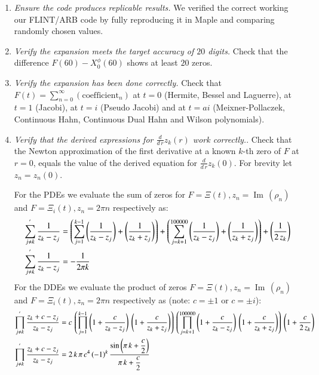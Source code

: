 \documentclass[a4paper,11pt,twoside]{amsart}
\renewcommand\Im{{\operatorname{Im\,}}}
\newcommand{\verifiedeq}{=}
\newcommand{\verifiedeq}{\stackrel{\checkmark}{=}}
\begin{document}
\begin{enumerate}
\item \textit{Ensure the code produces replicable results.} We verified the correct working our FLINT/ARB code by fully reproducing it in Maple\texttrademark  \cite{map} and comparing randomly chosen values. 
\item  \textit{Verify the expansion meets the target accuracy of $20$ digits.} Check that the difference $F(60)-X^\phi_0(60)$ shows at least $20$ zeros.
\item  \textit{Verify the expansion has been done correctly.} Check that $F(t) \verifiedeq \sum_{n=0}^\infty (\text{coefficient}_n)$ at $t=0$ (Hermite, Bessel and Laguerre), at $t=1$ (Jacobi), at $t=i$ (Pseudo Jacobi) and at $t\verifiedeq ai$ (Meixner-Pollaczek, Continuous Hahn, Continuous Dual Hahn and Wilson polynomials). 
\item \textit{Verify that the derived expressions for $\frac{d}{d\,r}z_k(r)$ work correctly.}. Check that the Newton approximation of the first derivative at a known $k$-th zero of $F$ at $r=0$, equals the value of the derived equation for $\frac{d}{d\,r}z_k(0)$. For brevity let $z_n = z_n(0)$. 

For the PDEs we evaluate the sum of zeros for $F=\Xi(t), z_n=\Im(\rho_n)$ and $F=\Xi_i(t), z_n=2\pi n$ respectively as:
\begin{align}
 \sum_{j \ne k}^{'} \frac{1}{z_k-z_j} &\verifiedeq \left(\sum_{j =1}^{k-1} \left(\frac{1}{z_k-z_j}\right)+\left(\frac{1}{z_k+z_j}\right)\right) +\left(\sum_{j = k+1}^{100000} \left(\frac{1}{z_k-z_j}\right)+\left(\frac{1}{z_k+z_j}\right)\right)+\left(\frac{1}{2\,z_k} \right) \notag \\
  \sum_{j \ne k}^{'} \frac{1}{z_k-z_j} &\verifiedeq -\frac{1}{2\pi k} \notag
\end{align}
For the DDEs we evaluate the product of zeros $F\verifiedeq \Xi(t), z_n=\Im(\rho_n)$ and $F=\Xi_i(t), z_n=2\pi n$ respectively as (note: $c \verifiedeq \pm 1$ or $c =\pm i$):
\begin{align}
 \prod_{j \ne k}^{'} \frac{z_k+c-z_j}{z_k-z_j} &\verifiedeq c\,\left(\prod_{j =1}^{k-1} \left(1+\frac{c}{z_k-z_j}\right)\,\left(1+\frac{c}{z_k+z_j}\right)\right)\,\left(\prod_{j = k+1}^{100000} \left(1+\frac{c}{z_k-z_j}\right)\,\left(1+\frac{c}{z_k+z_j}\right)\right)\,\left(1+\frac{c}{2\,z_k} \right) \notag \\
 \prod_{j \ne k}^{'} \frac{z_k+c-z_j}{z_k-z_j} &\verifiedeq 2\,k\,\pi\,c^4\,(-1)^k\,\frac{\sin\left(\pi\,k+\dfrac{c}{2}\right)}{\pi\,k+\dfrac{c}{2}} \notag
\end{align}
\end{enumerate}
\end{document}
